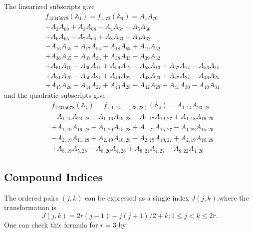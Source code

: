 \documentclass[aps, preprint]{revtex4}
\begin{document}
The linearized subscripts give
\begin{align} & f_{1 2 3 4 5 6 7 8} \left (\mathbb{A}_{4}\right ) =f_{1 ,70} \left (\mathbb{A}_{4}\right ) =A_{1} A_{7 0} \\
 &  -A_{2} A_{6 9} +A_{3} A_{6 8} -A_{4} A_{6 7} +A_{5} A_{6 6} \\
 &  +A_{6} A_{6 5} -A_{7} A_{6 4} +A_{8} A_{6 3} -A_{9} A_{6 2} \\
 &  -A_{1 6} A_{5 5} +A_{1 7} A_{5 4} -A_{1 8} A_{5 3} +A_{1 9} A_{5 2} \\
 &  +A_{3 6} A_{3 5} -A_{3 7} A_{3 4} +A_{3 8} A_{3 3} -A_{3 9} A_{3 2} \\
 &  +A_{6 1} A_{1 0} -A_{6 0} A_{1 1} +A_{5 9} A_{1 2} -A_{5 8} A_{1 3} +A_{5 7} A_{1 4} -A_{5 6} A_{1 5} \\
 &  +A_{5 1} A_{2 0} -A_{5 0} A_{2 1} +A_{4 9} A_{2 2} -A_{4 8} A_{2 3} +A_{4 7} A_{2 4} -A_{4 6} A_{2 5} \\
 &  +A_{4 5} A_{2 6} -A_{4 4} A_{2 7} +A_{4 3} A_{2 8} -A_{4 2} A_{2 9} +A_{4 1} A_{3 0} -A_{4 0} A_{3 1}\end{align}and the quadratic subscripts give
\begin{align} & f_{1 2 3 4 5 6 7 8} \left (\mathbb{A}_{4}\right ) =f_{\left (1 ,14\right ) ,\left (23 ,28\right )} \left (\mathbb{A}_{4}\right ) =A_{1 ,14} A_{23 ,28} \\
 &  -A_{1 ,15} A_{20 ,28} +A_{1 ,16} A_{19 ,28} -A_{1 ,17} A_{19 ,27} +A_{1 ,18} A_{19 ,26} \\
 &  +A_{1 ,19} A_{16 ,28} -A_{1 ,20} A_{15 ,28} +A_{1 ,21} A_{15 ,27} -A_{1 ,22} A_{15 ,26} \\
 &  -A_{2 ,19} A_{11 ,28} +A_{2 ,19} A_{10 ,28} -A_{2 ,19} A_{10 ,27} +A_{2 ,19} A_{10 ,26} \\
 &  +A_{8 ,19} A_{5 ,28} -A_{8 ,20} A_{4 ,28} +A_{8 ,21} A_{4 ,27} -A_{8 ,22} A_{4 ,26}\end{align}

\subsection{Compound Indices}
The ordered pairs $\left (j ,k\right )$ can be expressed as a single index $J \left (j ,k\right )\text{,}$where the transformation is
\begin{equation}J \left (j ,k\right ) =2 r \left (j -1\right ) -j \left (j +1\right )/2 +k ;1 \leq j <k \leq 2 r\text{.}
\end{equation}One can check this formula for $r =3$ by: 
\end{document}
